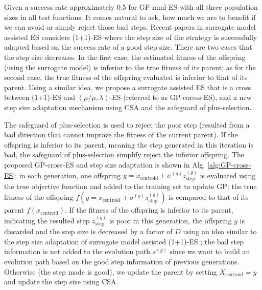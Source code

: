 Given a success rate approximately 0.5 for GP-mml-ES with all three population sizes in all test functions. It comes natural to ask, how much we are to benefit if we can avoid or simply reject those bad steps. Recent papers in surrogate model assisted ES considers (1+1)-ES \cite{DBLP:conf/ppsn/KayhaniA18} where the step size of the strategy is successfully adapted based on the success rate of a good step size. There are two cases that the step size decreases. In the first case, the estimated fitness of the offspring (using the surrogate model) is inferior to the true fitness of its parent; as for the second case, the true fitness of the offspring evaluated is inferior to that of its parent. Using a similar idea, we propose a surrogate assisted ES that is a cross between (1+1)-ES and $(\mu/\mu,\lambda)$-ES (referred to as GP-coress-ES), and a new step size adaptation mechanism using CSA and the safeguard of plus-selection. 

The safeguard of plus-selection is used to reject the poor step (resulted from a bad direction that cannot improve the fitness of the current parent). If the offspring is inferior to its parent, meaning the step generated in this iteration is bad, the safeguard of plus-selection simplify reject the inferior offspring. The proposed GP-cross-ES and step size adaptation is shown in Alg. \ref{alg:GP-cross-ES}: in each generation, one offspring $y=x_{\text{centroid}} + \sigma^{(g)} z_{\text{step}}^{(g)}$ is evaluated using the true objective function and added to the training set to update GP; the true fitness of the offspring $f(y=x_{\text{centroid}} + \sigma^{(g)} z_{\text{step}}^{(g)})$ is compared to that of its parent $f(x_{\text{centroid}})$. If the fitness of the offspring is inferior to its parent, indicating the resulted step $z_{\text{step}}^{(g)}$ is poor in this generation, the offspring $y$ is discarded and the step size is decreased by a factor of $D$ using an idea similar to the step size adaptation of surrogate model assisted (1+1)-ES \cite{DBLP:conf/ppsn/KayhaniA18}; the bad step information is not added to the evolution path $s^{(g)}$ since we want to build an evolution path based on the good step information of previous generations. Otherwise (the step made is good), we update the parent by setting $X_{\text{centroid}} = y$ and update the step size using CSA. 


